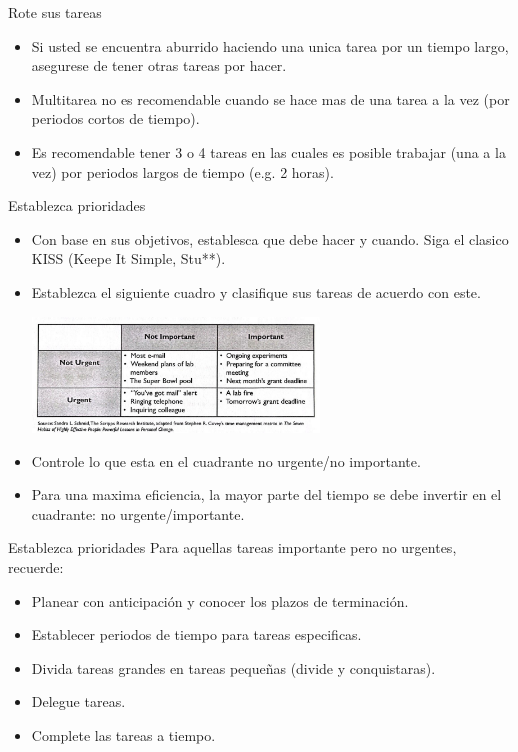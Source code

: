 \documentclass[
10pt,
aspectratio=169,
]{beamer}
\begin{document}
\begin{frame}[c]{Rote sus tareas}
\begin{itemize}
\item Si usted se encuentra aburrido haciendo una unica tarea por un tiempo largo, asegurese de tener otras tareas por hacer.
\item Multitarea no es recomendable cuando se hace mas de una tarea a la vez (por periodos cortos de tiempo).
\item Es recomendable tener 3 o 4 tareas en las cuales es posible trabajar (una a la vez) por periodos largos de tiempo (e.g. 2 horas).
\end{itemize}
\end{frame}

\begin{frame}[c]{Establezca prioridades}
\begin{itemize}
\item Con base en sus objetivos, establesca que debe hacer y cuando. Siga el clasico \alert{KISS} (Keepe It Simple, Stu**). 
\item Establezca el siguiente cuadro y clasifique sus tareas de acuerdo con este.
\begin{center}
\includegraphics[width=0.6\textwidth]{imUr.jpeg}
\end{center}
\item Controle lo que esta en el cuadrante no urgente/no importante.
\item \alert{Para una maxima eficiencia, la mayor parte del tiempo se debe invertir en el cuadrante: no urgente/importante.}
\end{itemize}
\end{frame}

\begin{frame}[c]{Establezca prioridades}
Para aquellas tareas importante pero no urgentes, recuerde:
\begin{itemize}
\item Planear con anticipaci\'on y conocer los plazos de terminaci\'on.
\item Establecer periodos de tiempo para tareas especificas.
\item Divida tareas grandes en tareas peque\~nas (divide y conquistaras).
\item Delegue tareas.
\item Complete las tareas a tiempo. 
\end{itemize}
\end{frame}
\end{document}
